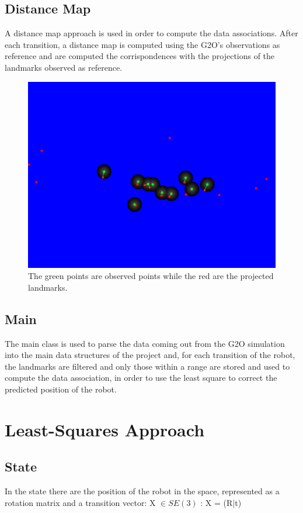 \documentclass[10pt]{article}
\begin{document}
		\subsection{Distance Map}
		A distance map approach is used in order to compute the data associations.
		After each transition, a distance map is computed using the G2O's observations as reference and are computed the corrispondences with the projections of the landmarks observed as reference.

		\begin{figure}
			\centering
			\includegraphics[width=0.7\linewidth]{img/corrispondences}
			\caption{The green points are observed points while the red are the projected landmarks.}
			\label{fig:corrispondences}
		\end{figure}

		\subsection{Main}
		The main class is used to parse the data coming out from the G2O simulation into the main data structures of the project and, for each transition of the robot, the landmarks are filtered and only those within a range are stored and used to compute the data association, in order to use the least square to correct the predicted position of the robot.\\
		 		
	\section{Least-Squares Approach}
	\subsection{State}
	In the state there are the position of the robot in the space, represented as a rotation matrix and a transition vector:
	X $\in \textit{SE}(3)$ : X = (R|t)
	
\end{document}
